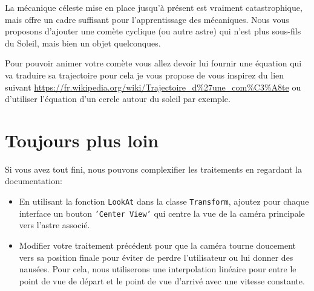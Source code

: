 \documentclass[a4paper,10pt]{article}
\begin{document}
La mécanique céleste mise en place jusqu'à présent est vraiment catastrophique, mais offre un cadre suffisant pour l'apprentissage des mécaniques. Nous vous proposons d'ajouter une comète cyclique (ou autre astre) qui n'est plus sous-fils du Soleil, mais bien un objet quelconques.

Pour pouvoir animer votre comète vous allez devoir lui fournir une équation qui va traduire sa trajectoire pour cela je vous propose de vous inspirez du lien suivant \url{https://fr.wikipedia.org/wiki/Trajectoire_d%27une_com%C3%A8te}
ou d'utiliser l'équation d'un cercle autour du soleil par exemple.

\section{Toujours plus loin}

Si vous avez tout fini, nous pouvons complexifier les traitements en regardant la documentation:
\begin{itemize}
	\item En utilisant la fonction \texttt{LookAt} dans la classe \texttt{Transform}, ajoutez pour chaque interface un bouton \texttt{'Center View'} qui centre la vue de la caméra principale vers l'astre associé.
	\item Modifier votre traitement précédent pour que la caméra tourne doucement vers sa position finale pour éviter de perdre l'utilisateur ou lui donner des nausées. Pour cela, nous utiliserons une interpolation linéaire pour entre le point de vue de départ et le point de vue d'arrivé avec une vitesse constante.
\end{itemize}
\end{document}
